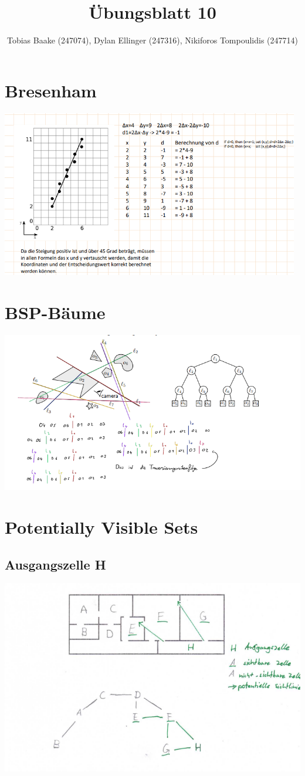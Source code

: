 \documentclass{article}
\title{Übungsblatt 10}
\author{Tobias Baake (247074), Dylan Ellinger (247316), Nikiforos Tompoulidis (247714)}
\begin{document}
\maketitle

\section{Bresenham}
\includegraphics[width=370pt]{./files/Übung11.1.png}

\section{BSP-Bäume}
\includegraphics[width=400pt]{./files/Übung11.2.png}

\section{Potentially Visible Sets}
\subsection*{Ausgangszelle H}
\includegraphics[width=400pt]{./files/Übung11.3.1.png}
\end{document}
